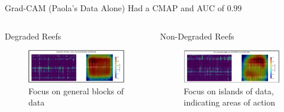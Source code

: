 \begin{frame}{Grad-CAM (Paola's Data Alone)}
    Had a CMAP and AUC of 0.99
    \begin{columns}
        \begin{column}{0.33\textwidth}
            Degraded Reefs
            \begin{figure}
                \centering
                \includegraphics[width=\linewidth,keepaspectratio]{images/degraded_grad_cam.png}
                \caption{Focus on general blocks of data}
            \end{figure}
        \end{column}
        
        \begin{column}{0.33\textwidth}
            Non-Degraded Reefs
            \begin{figure}
                \centering
                \includegraphics[width=\linewidth,keepaspectratio]{images/non_degraded_grad_cam.png}
                \caption{Focus on islands of data, indicating areas of action}
            \end{figure}
        \end{column}
        

\end{columns}
\end{frame}
